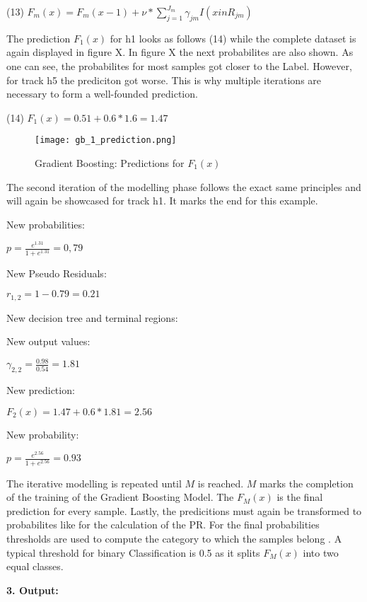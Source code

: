 (13) \(F_{m}(x) = F_{m}(x- 1) + \nu * \sum_{j = 1}^{J_{m}} \gamma_{jm}I(x in R_{jm}) \)

The prediction \(F_{1}(x)\) for h1 looks as follows (14) while the complete dataset is again displayed in figure X. In figure X
the next probabilites are also shown. As one can see, the probabilites for most samples got closer to the Label. However, for track
h5 the prediciton got worse. This is why multiple iterations are necessary to form a well-founded prediction. 

(14) \(F_{1}(x) = 0.51 + 0.6 * 1.6 = 1.47 \)

\begin{figure}[H]
    \centering
    \caption[]{Gradient Boosting: Predictions for \(F_{1}(x)\)}
	\label{gb_1_prediction}
    \texttt{[image: gb\_1\_prediction.png]}
\end{figure}

The second iteration of the modelling phase follows the exact same principles and will again be showcased for track h1. 
It marks the end for this example. 

New probabilities:

\(p = \frac{e^{1.31}}{1 + e^{1.31}} = 0,79 \)

New Pseudo Residuals: 

\(r_{1, 2} = 1 - 0.79 = 0.21 \)

New decision tree and terminal regions:



New output values: 

\(\gamma_{2,2} = \frac{0.98}{0.54} = 1.81 \)

New prediction:

\(F_{2}(x) = 1.47 + 0.6 * 1.81 = 2.56\)

New probability:

\(p = \frac{e^{2.56}}{1 + e^{2.56}} = 0.93 \)

The iterative modelling is repeated until \(M\) is reached. \(M\) marks the completion of the training of the Gradient 
Boosting Model. The \(F_{M}(x)\) is the final prediction for every sample. Lastly, the predicitions
must again be transformed to probabilites like for the calculation of the PR. For the final probabilities 
thresholds are used to compute the category to which the samples belong \cite[p.1204]{Friedman_2001}. A typical threshold 
for binary Classification is 0.5 as it splits \(F_{M}(x)\) into two equal classes.

\textbf{3. Output:}

